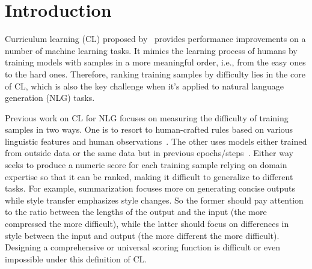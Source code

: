 \section{Introduction}
\label{sec:intro}

Curriculum learning (CL) proposed by~\citet{bengio2009curriculum} provides performance improvements on a number of machine learning tasks.
It mimics the learning process of humans by training models with samples in a 
more meaningful order, i.e., from the easy ones to the hard ones.
Therefore, ranking training samples by difficulty lies in the core of CL, 
which is also the key challenge when it's applied to natural language generation (NLG) 
tasks.

Previous work on CL for NLG focuses on measuring the difficulty of training samples 
in two ways. One is to resort to human-crafted rules based on various linguistic features 
and human observations~\cite{liu2018curriculum,kocmi2017curriculum}. 
The other uses models either trained from outside data or the same data but
in previous epochs/steps~\cite{zhou2020uncertainty,kumar2019reinforcement,shen2020cdl}.
Either way seeks to produce a numeric score for each training sample relying on domain expertise so that it can
be ranked,  
making it difficult to generalize 
to different tasks. For example, summarization focuses more on generating concise 
outputs while style transfer emphasizes style changes. So the former should pay 
attention to the ratio between the lengths of the output and the input (the more compressed
the more difficult), while the 
latter should focus on differences in style between the input and output (the more
different the more difficult).
Designing a comprehensive or universal scoring function is difficult or 
even impossible under this definition of CL.
